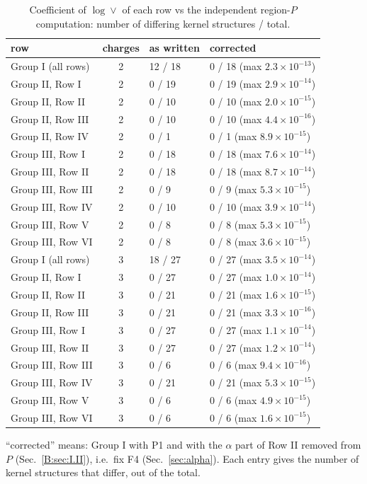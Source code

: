 \documentclass[10pt]{article}
\numberwithin{equation}{section}
\begin{document}
\begin{table}[H]
\centering\small
\begin{tabular}{@{}l c l l@{}}
row & charges & as written & corrected \\ \hline
Group I (all rows) & 2 & 12 / 18 & 0 / 18 (max $2.3\times10^{-13}$)\\
Group II, Row I & 2 & 0 / 19 & 0 / 19 (max $2.9\times10^{-14}$)\\
Group II, Row II & 2 & 0 / 10 & 0 / 10 (max $2.0\times10^{-15}$)\\
Group II, Row III & 2 & 0 / 10 & 0 / 10 (max $4.4\times10^{-16}$)\\
Group II, Row IV & 2 & 0 / 1 & 0 / 1 (max $8.9\times10^{-15}$)\\
Group III, Row I & 2 & 0 / 18 & 0 / 18 (max $7.6\times10^{-14}$)\\
Group III, Row II & 2 & 0 / 18 & 0 / 18 (max $8.7\times10^{-14}$)\\
Group III, Row III & 2 & 0 / 9 & 0 / 9 (max $5.3\times10^{-15}$)\\
Group III, Row IV & 2 & 0 / 10 & 0 / 10 (max $3.9\times10^{-14}$)\\
Group III, Row V & 2 & 0 / 8 & 0 / 8 (max $5.3\times10^{-15}$)\\
Group III, Row VI & 2 & 0 / 8 & 0 / 8 (max $3.6\times10^{-15}$)\\
Group I (all rows) & 3 & 18 / 27 & 0 / 27 (max $3.5\times10^{-14}$)\\
Group II, Row I & 3 & 0 / 27 & 0 / 27 (max $1.0\times10^{-14}$)\\
Group II, Row II & 3 & 0 / 21 & 0 / 21 (max $1.6\times10^{-15}$)\\
Group II, Row III & 3 & 0 / 21 & 0 / 21 (max $3.3\times10^{-16}$)\\
Group III, Row I & 3 & 0 / 27 & 0 / 27 (max $1.1\times10^{-14}$)\\
Group III, Row II & 3 & 0 / 27 & 0 / 27 (max $1.2\times10^{-14}$)\\
Group III, Row III & 3 & 0 / 6 & 0 / 6 (max $9.4\times10^{-16}$)\\
Group III, Row IV & 3 & 0 / 21 & 0 / 21 (max $5.3\times10^{-15}$)\\
Group III, Row V & 3 & 0 / 6 & 0 / 6 (max $4.9\times10^{-15}$)\\
Group III, Row VI & 3 & 0 / 6 & 0 / 6 (max $1.6\times10^{-15}$)\\
\end{tabular}
\caption{Coefficient of $\log\vee$ of each row vs the independent region-$P$ computation: number of differing kernel structures / total.}\label{B:tab:rowsP}
\end{table}
``corrected'' means: Group I with P1 and with the $\alpha$ part of Row II removed from $P$ (Sec.~\ref{B:sec:I.II}), i.e.\ fix F4 (Sec.~\ref{sec:alpha}). Each entry gives the number of kernel structures that differ, out of the total.
\end{document}
